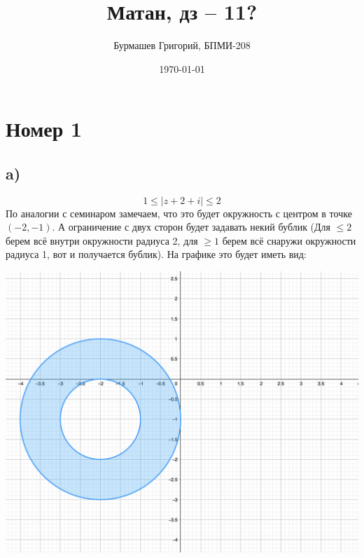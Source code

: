\documentclass[a4paper,12pt]{article}
\author{Бурмашев Григорий, БПМИ-208}
\title{Матан, дз -- 11?}
\date{\today}
\begin{document}
\section*{Номер 1}
\subsection*{a)}
\[
1 \leq | z + 2 + i | \leq 2
\]	
По аналогии с семинаром замечаем, что это будет окружность с центром в точке $(-2, -1)$. А ограничение с двух сторон будет задавать некий бублик (Для $\leq 2$ берем всё внутри окружности радиуса 2, для $\geq 1$ берем всё снаружи окружности радиуса 1, вот и получается бублик). На графике это будет иметь вид:
\begin{center}
\includegraphics[scale=0.3]{1.png}
\end{center}
\clearpage
\end{document}
